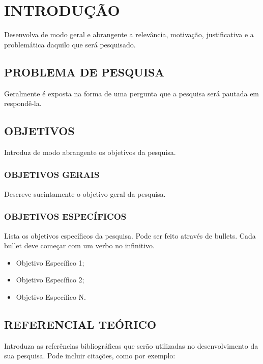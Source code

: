 \documentclass{abntpuc}
\author         {João E. L. Fouyer}
\begin{document}
\capa

\folharosto

\sumario

\chapter{INTRODUÇÃO} 

Desenvolva de modo geral e abrangente a relevância, motivação, justificativa e a problemática daquilo que será pesquisado.

\section{PROBLEMA DE PESQUISA}

Geralmente é exposta na forma de uma pergunta que a pesquisa será pautada em respondê-la.

\section{OBJETIVOS}

Introduz de modo abrangente os objetivos da pesquisa.

\subsection{OBJETIVOS GERAIS}

Descreve sucintamente o objetivo geral da pesquisa.

\subsection{OBJETIVOS ESPECÍFICOS}

Lista os objetivos específicos da pesquisa. Pode ser feito através de bullets. Cada bullet deve começar com um verbo no infinitivo.

\begin{itemize}
    \item Objetivo Específico 1;
    \item Objetivo Específico 2;
    \item Objetivo Específico N.
\end{itemize}

\section{REFERENCIAL TEÓRICO}

Introduza as referências bibliográficas que serão utilizadas no desenvolvimento da sua pesquisa. Pode incluir citações, como por exemplo:
\end{document}

